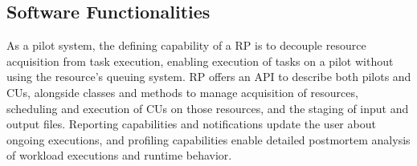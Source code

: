 \documentclass[preprint,12pt, a4paper]{elsarticle}
\begin{document}
\subsection{Software Functionalities}\label{ssec:functionalities}



As a pilot system, the defining capability of a RP is to decouple resource
acquisition from task execution, enabling execution of tasks on a pilot
without using the resource's queuing system. RP offers an API to describe
both pilots and CUs, alongside classes and methods to manage acquisition of
resources, scheduling and execution of CUs on those resources, and the
staging of input and output files. Reporting capabilities and notifications
update the user about ongoing executions, and profiling capabilities enable
detailed postmortem analysis of workload executions and runtime behavior.


\end{document}
